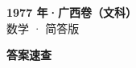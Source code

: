 \documentclass[zihao=-4, a4paper]{ctexart}
\begin{document}
\begin{center}
  {\Large\bfseries 1977 年·广西卷（文科）}\\[4pt]
  {\large 数学 · 简答版}
\end{center}
\medskip
{}

\clearpage
{}
\begin{center}{\Large\bfseries 答案速查}\end{center}
\medskip

\end{document}
